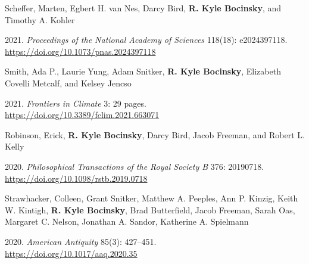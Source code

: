 Scheffer, Marten, Egbert H. van Nes, Darcy Bird, {\bf R. Kyle Bocinsky}, and Timothy A. Kohler
\begin{list1}
\item[] 2021\hspace{.2cm}{Loss of resilience preceded transformations of pre-Hispanic Pueblo societies}. \emph{Proceedings of the National Academy of Sciences} 118(18): e2024397118.\\\href{https://doi.org/10.1073/pnas.2024397118}{https://doi.org/10.1073/pnas.2024397118}
\end{list1}


Smith, Ada P., Laurie Yung, Adam Snitker, {\bf R. Kyle Bocinsky}, Elizabeth Covelli Metcalf, and Kelsey Jencso
\begin{list1}
\item[] 2021\hspace{.2cm}{Scalar mismatches and underlying factors for underutilization of climate information: Perspectives from farmers and ranchers}. \emph{Frontiers in Climate} 3: 29 pages.\\\href{https://doi.org/10.3389/fclim.2021.663071}{https://doi.org/10.3389/fclim.2021.663071}
\end{list1}


Robinson, Erick, {\bf R. Kyle Bocinsky}, Darcy Bird, Jacob Freeman, and Robert L. Kelly
\begin{list1}
\item[] 2020\hspace{.2cm}{Dendrochronological dates confirm a Late Prehistoric population decline in the American Southwest derived from radiocarbon dates}. \emph{Philosophical Transactions of the Royal Society B} 376: 20190718.\\\href{https://doi.org/10.1098/rstb.2019.0718}{https://doi.org/10.1098/rstb.2019.0718}
\end{list1}


Strawhacker, Colleen, Grant Snitker, Matthew A. Peeples, Ann P. Kinzig, Keith W. Kintigh, {\bf R. Kyle Bocinsky}, Brad Butterfield, Jacob Freeman, Sarah Oas, Margaret C. Nelson, Jonathan A. Sandor, Katherine A. Spielmann
\begin{list1}
\item[] 2020\hspace{.2cm}{A landscape perspective on climate-driven risks to food security: Exploring the relationship between climate and social transformations in the Prehispanic U.S. Southwest}. \emph{American Antiquity} 85(3): 427–451.\\\href{https://doi.org/10.1017/aaq.2020.35}{https://doi.org/10.1017/aaq.2020.35}

\end{list1}


